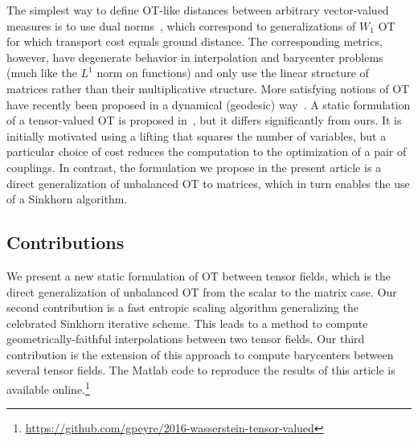 The simplest way to define OT-like distances between arbitrary vector-valued measures is to use dual norms~\cite{Ning2014metrics}, which correspond to generalizations of $W_1$ OT for which transport cost equals ground distance. The corresponding metrics, however, have degenerate behavior in interpolation and barycenter problems (much like the $L^1$ norm on functions) and only use the linear structure of matrices rather than their multiplicative structure.
%
More satisfying notions of OT have recently been proposed in a dynamical (geodesic) way~\cite{Chen2016,JiangSpectral}. 
%
A static formulation of a tensor-valued OT is proposed in~\cite{ning2015matrix}, but it differs significantly from ours. It is initially motivated using a lifting that squares the number of variables, but a particular choice of cost reduces the computation to the optimization of a pair of couplings. In contrast, the formulation we propose in the present article is a direct generalization of unbalanced OT to matrices, which in turn enables the use of a Sinkhorn algorithm. 







\subsection{Contributions} 

We present a new static formulation of OT between tensor fields, which is the direct generalization of unbalanced OT from the scalar to the matrix case.
%
Our second contribution is a fast entropic scaling algorithm generalizing the celebrated Sinkhorn iterative scheme. This leads to a method to compute geometrically-faithful interpolations between two tensor fields. 
%
Our third contribution is the extension of this approach to compute barycenters between several tensor fields. 
%
The Matlab code to reproduce the results of this article is available online.\footnote{\url{https://github.com/gpeyre/2016-wasserstein-tensor-valued}}

